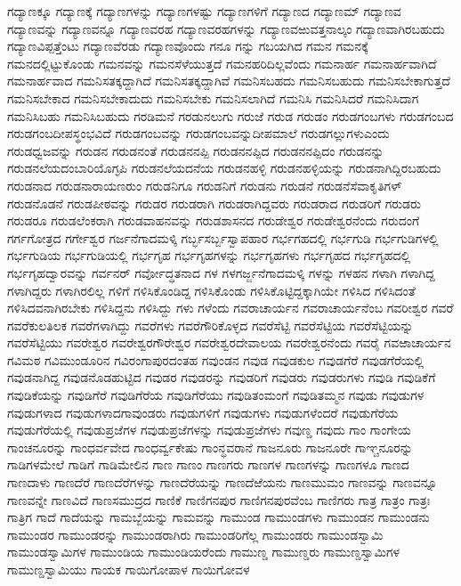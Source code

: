 {ಗದ್ಯಾಣಕ್ಕೂ
ಗದ್ಯಾಣಕ್ಕೆ
ಗದ್ಯಾಣಗಳನ್ನು
ಗದ್ಯಾಣಗಳಷ್ಟು
ಗದ್ಯಾಣಗಳಿಗೆ
ಗದ್ಯಾಣದ
ಗದ್ಯಾಣಮ್
ಗದ್ಯಾಣವ
ಗದ್ಯಾಣವನ್ನು
ಗದ್ಯಾಣವನ್ನೂ
ಗದ್ಯಾಣವರಹ
ಗದ್ಯಾಣವರಹಗಳನ್ನು
ಗದ್ಯಾಣವಱುವತ್ತನಾಲ್ಕಂ
ಗದ್ಯಾಣವಾಗಿರಬಹುದು
ಗದ್ಯಾಣವಿಪ್ಪತ್ತೆಂಟು
ಗದ್ಯಾಣವೆರಡು
ಗದ್ಯಾಣವೊಂದು
ಗನೂ
ಗನ್ನು
ಗಬಯಗಿದ
ಗಮನ
ಗಮನಕ್ಕೆ
ಗಮನದಲ್ಲಿಟ್ಟುಕೊಂಡು
ಗಮನವನ್ನು
ಗಮನಸೆಳೆಯುತ್ತದೆ
ಗಮನಹರಿದಿಲ್ಲವೆಂದು
ಗಮನಾರ್ಹ
ಗಮನಾರ್ಹವಾಗಿದೆ
ಗಮನಾರ್ಹವಾದ
ಗಮನಿಸತಕ್ಕದ್ದಾಗಿದೆ
ಗಮನಿಸತಕ್ಕದ್ದಾಗಿವೆ
ಗಮನಿಸಬಹದು
ಗಮನಿಸಬಹುದು
ಗಮನಿಸಬೇಕಾಗುತ್ತದೆ
ಗಮನಿಸಬೇಕಾದ
ಗಮನಿಸಬೇಕಾದುದು
ಗಮನಿಸಬೇಕು
ಗಮನಿಸಲಾಗಿದೆ
ಗಮನಿಸಿ
ಗಮನಿಸಿದರೆ
ಗಮನಿಸಿದಾಗ
ಗಮನಿಸಿಬಹು
ಗಮನಿಸಿಬಹುದು
ಗರಡಿಮನೆ
ಗರಡುನಲುಗು
ಗರುಜೆ
ಗರುಡ
ಗರುಡಂ
ಗರುಡಗಂಬಗಳು
ಗರುಡಗಂಬದ
ಗರುಡಗಂಬದೀಪಸ್ಥಂಭವಿದೆ
ಗರುಡಗಂಬವನ್ನು
ಗರುಡಗಂಬವನ್ನುದೀಪಮಾಲೆ
ಗರುಡಗಲ್ಲುಗಳುಎಂದು
ಗರುಡಧ್ವಜವನ್ನು
ಗರುಡನ
ಗರುಡನಂತೆ
ಗರುಡನನಪ್ಪಿ
ಗರುಡನನಪ್ಪಿದ
ಗರುಡನನಪ್ಪಿದಂ
ಗರುಡನನ್ನು
ಗರುಡನಲೆಯದಂಬಾರಿಯೊಗ್ಳಪಿ
ಗರುಡನಲೆಯದನೆಯ
ಗರುಡನಹಳ್ಳಿ
ಗರುಡನಹಳ್ಳಿಯನ್ನು
ಗರುಡನಾಗಿದ್ದಿರಬಹುದು
ಗರುಡನಾದ
ಗರುಡನಾರಾಯಣರುಂ
ಗರುಡನಿಗೂ
ಗರುಡನಿಗೆ
ಗರುಡನು
ಗರುಡನೆ
ಗರುಡನೆಸೆವಾಕೃತಿಗಳ್
ಗರುಡನೊಡನೆ
ಗರುಡಪೀಠವನ್ನು
ಗರುಡರ
ಗರುಡರಾಗಿ
ಗರುಡರಾಗಿದ್ದವರು
ಗರುಡರಾದ
ಗರುಡರಿಗೆ
ಗರುಡರು
ಗರುಡರೂ
ಗರುಡಲೆಂಕರಾಗಿ
ಗರುಡವಾಹನವನ್ನು
ಗರುಡಶಾಸನದ
ಗರುಡೇಶ್ವರ
ಗರುಡೇಶ್ವರನೆಂದು
ಗರುದಂಗೆ
ಗರ್ಗಗೋತ್ರದ
ಗರ್ಗೇಶ್ವರ
ಗರ್ಜನೆಗಾದಮಳ್ಕಿ
ಗರ್ಬ್ಭಸರ್ಬ್ಬಸ್ವಾಪಹಾರ
ಗರ್ಭಗಹದಲ್ಲಿ
ಗರ್ಭಗುಡಿ
ಗರ್ಭಗುಡಿಗಳಲ್ಲಿ
ಗರ್ಭಗುಡಿಯ
ಗರ್ಭಗುಡಿಯಲ್ಲಿ
ಗರ್ಭಗೃಹ
ಗರ್ಭಗೃಹಗಳನ್ನು
ಗರ್ಭಗೃಹಗಳು
ಗರ್ಭಗೃಹದ
ಗರ್ಭಗೃಹದಲ್ಲಿ
ಗರ್ಭಗೃಹದ್ವಾರವನ್ನು
ಗರ್ವನರ್
ಗರ್ವೋದ್ಧತನಾದ
ಗಳ
ಗಳಗರ್ಜ್ಜನೆಗಾದಮಳ್ಕಿ
ಗಳನ್ನು
ಗಳಹನ
ಗಳಾಗಿ
ಗಳಾಗಿದ್ದ
ಗಳಾಗಿದ್ದರು
ಗಳಾಗಿರಲಿಲ್ಲ
ಗಳಿಗೆ
ಗಳಿಸಿಕೊಂಡಿದ್ದ
ಗಳಿಸಿಕೊಂಡು
ಗಳಿಸಿಕೊಟ್ಟಿದ್ದಕ್ಕಾಗಿಯೇ
ಗಳಿಸಿದ
ಗಳಿಸಿದಂತೆ
ಗಳಿಸಿದವನಾಗಿರಬೇಕು
ಗಳಿಸಿದ್ದನು
ಗಳಿಸಿದ್ದು
ಗಳು
ಗಳೆಂದು
ಗವರಾಚಾರ್ಯನ
ಗವರಾಚಾರ್ಯನೆಂಬ
ಗವರೀಶ್ವರ
ಗವರೆ
ಗವರೆಕುಲತಿಲಕ
ಗವರೆಗಳಾಗಿದ್ದು
ಗವರೆಗಳು
ಗವರೆಗೌರಿಕೊಳ್ಳದ
ಗವರೆಸೆಟ್ಟಿ
ಗವರೆಸೆಟ್ಟಿಯ
ಗವರೆಸೆಟ್ಟಿಯನ್ನು
ಗವರೆಸೆಟ್ಟಿಯು
ಗವರೇಶ್ವರ
ಗವರೇಶ್ವರಗೌರೇಶ್ವರ
ಗವರೇಶ್ವರದೇವಾಲಯ
ಗವರೇಶ್ವರನೆಂದು
ಗವರೈ
ಗವಱಾಚಾರ್ಯನ
ಗವಿಮಠ
ಗವಿಮುಂಡೂರಿನ
ಗವಿರಂಗಾಪುರದಂತಹ
ಗವುಂಡನ
ಗವುಡ
ಗವುಡಕುಲ
ಗವುಡಗೆರೆ
ಗವುಡಗೆರೆಯಲ್ಲಿ
ಗವುಡನಾಗಿದ್ದ
ಗವುಡನೊಡಹುಟ್ಟಿದ
ಗವುಡರ
ಗವುಡರನ್ನು
ಗವುಡರಿಗೆ
ಗವುಡರು
ಗವುಡರುಗಳು
ಗವುಡಿ
ಗವುಡಿಕೆಗೆ
ಗವುಡಿಕೆಯನ್ನು
ಗವುಡಿಗೆರೆ
ಗವುಡಿಗೆರೆಯ
ಗವುಡಿಗೆರೆಯು
ಗವುಡಿತಂಮಂಗೆ
ಗವುಡಿತಮ್ಮನ
ಗವುಡು
ಗವುಡುಗಳ
ಗವುಡುಗಳಾದ
ಗವುಡುಗಳಾದಗಾವುಂಡರು
ಗವುಡುಗಳಿಗೆ
ಗವುಡುಗಳು
ಗವುಡುಗಳೆಂದರೆ
ಗವುಡುಗೆರೆಯ
ಗವುಡುಗೆರೆಯಲ್ಲಿ
ಗವುಡುಪ್ರಜೆಗಳ
ಗವುಡುಪ್ರಜೆಗಳನ್ನು
ಗವುಡುಪ್ರಜೆಗಳು
ಗವುಣ್ಡ
ಗವುದು
ಗಾಂ
ಗಾಂಗೇಯ
ಗಾಂಚನೂರನ್ನು
ಗಾಂಧರ್ವವೇದ
ಗಾಂಧರ್ವ್ವಕೇಷು
ಗಾಂನ್ಧವರಾನೆ
ಗಾಜನೂರು
ಗಾಜನೂರೇ
ಗಾಞ್ಚನೂರನ್ನು
ಗಾಡಿಗಳಮೇಲೆ
ಗಾಡಿಗೆ
ಗಾಡಿಮೇಲಿನ
ಗಾಣ
ಗಾಣಂ
ಗಾಣಗರು
ಗಾಣಗಳ
ಗಾಣಗಳನ್ನು
ಗಾಣಗಳೂ
ಗಾಣದ
ಗಾಣದಾಳು
ಗಾಣದೆರೆ
ಗಾಣದೆರೆಗಳನ್ನು
ಗಾಣದೆರೆಯನ್ನು
ಗಾಣದೆಱೆಯನು
ಗಾಣಮುಮಂ
ಗಾಣವನ್ನು
ಗಾಣವನ್ನೂ
ಗಾಣವನ್ನೇ
ಗಾಣವಿದೆ
ಗಾಣಸಮುದ್ರದ
ಗಾಣಿಕೆ
ಗಾಣಿಗನಪುರ
ಗಾಣಿಗನಪುರವೆಂಬ
ಗಾಣಿಗರು
ಗಾತ್ರ
ಗಾತ್ರಂ
ಗಾತ್ರಃ
ಗಾತ್ರಿಗ
ಗಾದೆ
ಗಾದೆಯನ್ನು
ಗಾಮಬ್ಬೆಯನ್ನು
ಗಾಮವನ್ನು
ಗಾಮುಂಡ
ಗಾಮುಂಡಗಳು
ಗಾಮುಂಡನ
ಗಾಮುಂಡನು
ಗಾಮುಂಡರ
ಗಾಮುಂಡರನ್ನು
ಗಾಮುಂಡರಾಗಿರು
ಗಾಮುಂಡರಿಗೆಲ್ಲ
ಗಾಮುಂಡರು
ಗಾಮುಂಡಸ್ವಾಮಿ
ಗಾಮುಂಡಸ್ವಾಮಿಗಳ
ಗಾಮುಂಡಿಯ
ಗಾಮುಂಡಿಯರೆಂದು
ಗಾಮುಣ್ಡ
ಗಾಮುಣ್ಡರು
ಗಾಮುಣ್ಡಸ್ವಾಮಿಗಳ
ಗಾಮುಣ್ಡಸ್ವಾಮಿಯು
ಗಾಯಕ
ಗಾಯಿಗೋಪಾಳ
ಗಾಯಿಗೋವಳ
}
